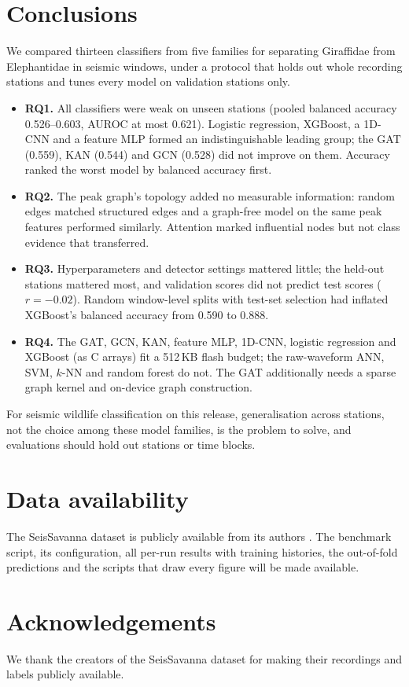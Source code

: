 \documentclass[a4paper,fleqn]{cas-dc}
\begin{document}
\section{Conclusions}\label{sec:conclusion}
We compared thirteen classifiers from five families for separating Giraffidae from
Elephantidae in seismic windows, under a protocol that holds out whole recording
stations and tunes every model on validation stations only.
\begin{itemize}
\item \textbf{RQ1.} All classifiers were weak on unseen stations (pooled balanced
accuracy 0.526--0.603, AUROC at most 0.621). Logistic regression, XGBoost, a 1D-CNN and
a feature MLP formed an indistinguishable leading group; the GAT (0.559), KAN (0.544)
and GCN (0.528) did not improve on them. Accuracy ranked the worst model by balanced
accuracy first.
\item \textbf{RQ2.} The peak graph's topology added no measurable information: random
edges matched structured edges and a graph-free model on the same peak features
performed similarly. Attention marked influential nodes but not class evidence that
transferred.
\item \textbf{RQ3.} Hyperparameters and detector settings mattered little; the held-out
stations mattered most, and validation scores did not predict test scores ($r=-0.02$).
Random window-level splits with test-set selection had inflated XGBoost's balanced
accuracy from 0.590 to 0.888.
\item \textbf{RQ4.} The GAT, GCN, KAN, feature MLP, 1D-CNN, logistic regression and
XGBoost (as C arrays) fit a 512\,KB flash budget; the raw-waveform ANN, SVM, $k$-NN and
random forest do not. The GAT additionally needs a sparse graph kernel and on-device
graph construction.
\end{itemize}
For seismic wildlife classification on this release, generalisation across stations,
not the choice among these model families, is the problem to solve, and evaluations
should hold out stations or time blocks.

\FloatBarrier

\section*{Data availability}
The SeisSavanna dataset is publicly available from its authors \citep{szenicer2022}.
The benchmark script, its configuration, all per-run results with training histories,
the out-of-fold predictions and the scripts that draw every figure will be made
available. %

\section*{Acknowledgements}
We thank the creators of the SeisSavanna dataset for making their recordings and
labels publicly available. %

\FloatBarrier


\end{document}
